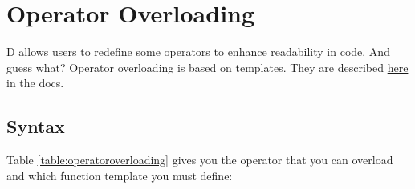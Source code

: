 \section{Operator Overloading} \label{operatoroverloading}


D allows users to redefine some operators to enhance readability in code. And guess what? Operator overloading is based on templates. They are described \href{www.dlang.org/operatoroverloading.html}{here} in the docs. 

\subsection{Syntax}

Table \ref{table:operatoroverloading} gives you the operator that you can overload and which function template you must define:

